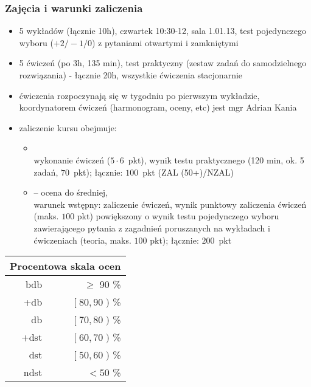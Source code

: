\begin{frame}
\frametitle{Zajęcia i warunki zaliczenia}

\scriptsize

 \begin{itemize} \item 5 wykładów (łącznie 10h), czwartek 10:30-12,
 sala 1.01.13,  test
 pojedynczego wyboru ($+2/-1/0$) z pytaniami otwartymi i zamkniętymi

 \item 5 ćwiczeń (po 3h, 135 min),  test praktyczny
       (zestaw zadań do samodzielnego rozwiązania) - łącznie 20h,
       wszystkie ćwiczenia stacjonarnie

 \item ćwiczenia rozpoczynają się w tygodniu po pierwszym wykładzie,
 koordynatorem ćwiczeń (harmonogram, oceny, etc) jest mgr Adrian Kania
\end{itemize}

\begin{minipage}[t]{.65\textwidth}\vspace{0pt}
\begin{itemize}
 \item zaliczenie kursu
 obejmuje: \begin{itemize}\scriptsize \item {}\\
 wykonanie ćwiczeń ($5 \cdot 6$~pkt), wynik testu praktycznego
 (120 min, ok. 5 zadań, $70$~pkt); łącznie: $100$~pkt (ZAL
 (50+)/NZAL) \item {} -- ocena do średniej,\\
 warunek wstępny: zaliczenie ćwiczeń, wynik punktowy zaliczenia
 ćwiczeń (maks. $100$ pkt) powiększony o wynik testu pojedynczego
 wyboru zawierającego pytania z zagadnień poruszanych na wykładach i
 ćwiczeniach (teoria, maks. $100$ pkt); łącznie:
 $200$~pkt \end{itemize} \end{itemize}
\end{minipage}\hfill
\begin{minipage}[t]{.34\textwidth}\vspace{0pt}
\scriptsize\centering\renewcommand{\arraystretch}{1.2}
 \begin{tabular} {r | r}
\multicolumn{2}{c}{Procentowa skala ocen}\\
\hline
bdb & $\ge$ 90 \%\\
+db & $[\; 80, 90 \;)$ \%\\
db &  $[\; 70, 80 \;)$ \%\\
+dst & $[\; 60, 70 \;)$ \%\\
dst & $[\; 50, 60 \;)$ \%\\
ndst & $< 50$ \%
 \end{tabular}
\end{minipage}
\end{frame}

